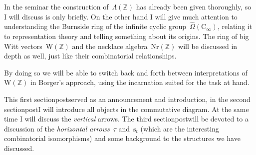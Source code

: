 In the seminar the construction of~$\Lambda(\mathbb{Z})$ has already been given thoroughly, so I will discuss is only briefly. On the other hand I will give much attention to understanding the Burnside ring of the infinite cyclic group~$\hat{\Omega}(\mathrm{C}_\infty)$, relating it to representation theory and telling something about its origins. The ring of big Witt vectors~$\mathrm{W}(\mathbb{Z})$ and the necklace algebra~$\mathrm{Nr}(\mathbb{Z})$ will be discussed in depth as well, just like their combinatorial relationships.

By doing so we will be able to switch back and forth between interpretations of~$\mathrm{W}(\mathbb{Z})$ in Borger's approach, using the incarnation suited for the task at hand.

This first \iftex section\fi\ifblog post\fi served as an announcement and introduction, in the second \iftex section\fi\ifblog post\fi I will introduce all objects in the commutative diagram. At the same time I will discuss the \emph{vertical} arrows. The third \iftex section\fi\ifblog post\fi will be devoted to a discussion of the \emph{horizontal arrows}~$\tau$ and~$\mathrm{s}_t$ (which are the interesting combinatorial isomorphisms) and some background to the structures we have discussed.

